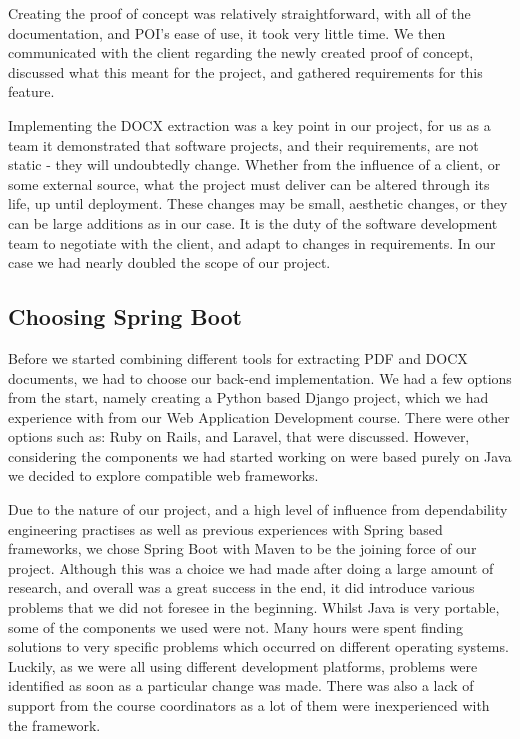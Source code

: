 \documentclass{l3proj}
\begin{document}
Creating the proof of concept was relatively straightforward, with all of the documentation, and POI's ease of use, it took very little time. We then communicated with the client regarding the newly created proof of concept, discussed what this meant for the project, and gathered requirements for this feature.

Implementing the DOCX extraction was a key point in our project, for us as a team it demonstrated that software projects, and their requirements, are not static - they will undoubtedly change. Whether from the influence of a client, or some external source, what the project must deliver can be altered through its life, up until deployment. These changes may be small, aesthetic changes, or they can be large additions as in our case. It is the duty of the software development team to negotiate with the client, and adapt to changes in requirements. In our case we had nearly doubled the scope of our project.

\subsection{Choosing Spring Boot}
\label{sec:choosing_spring}
Before we started combining different tools for extracting PDF and DOCX documents, we had to choose our back-end implementation. We had a few options from the start, namely creating a Python based Django project, which we had experience with from our Web Application Development course. There were other options such as: Ruby on Rails, and Laravel, that were discussed. However, considering the components we had started working on were based purely on Java we decided to explore compatible web frameworks.

Due to the nature of our project, and a high level of influence from dependability engineering \cite{Dependability} practises as well as previous experiences with Spring based frameworks, we chose Spring Boot with Maven to be the joining force of our project. Although this was a choice we had made after doing a large amount of research, and overall was a great success in the end, it did introduce various problems that we did not foresee in the beginning. Whilst Java is very portable, some of the components we used were not. Many hours were spent finding solutions to very specific problems which occurred on different operating systems. Luckily, as we were all using different development platforms, problems were identified as soon as a particular change was made. There was also a lack of support from the course coordinators as a lot of them were inexperienced with the framework.
\end{document}
